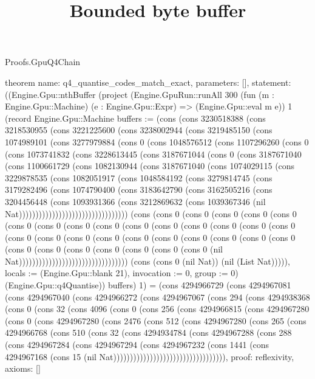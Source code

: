 \begin{lexlean}{Proofs.GpuQ4Chain}
\title{Bounded byte buffer}
\begin{semanticmodule}
theorem{
  name: q4_quantise_codes_match_exact,
  parameters: [],
  statement: ((Engine.Gpu::nthBuffer (project (Engine.GpuRun::runAll 300 (fun (m : Engine.Gpu::Machine) (e : Engine.Gpu::Expr) => (Engine.Gpu::eval m e)) 1 (record Engine.Gpu::Machine {buffers := (cons (cons 3230518388 (cons 3218530955 (cons 3221225600 (cons 3238002944 (cons 3219485150 (cons 1074989101 (cons 3277979884 (cons 0 (cons 1048576512 (cons 1107296260 (cons 0 (cons 1073741832 (cons 3228613445 (cons 3187671044 (cons 0 (cons 3187671040 (cons 1100661729 (cons 1082130944 (cons 3187671040 (cons 1074029115 (cons 3229878535 (cons 1082051917 (cons 1048584192 (cons 3279814745 (cons 3179282496 (cons 1074790400 (cons 3183642790 (cons 3162505216 (cons 3204456448 (cons 1093931366 (cons 3212869632 (cons 1039367346 (nil Nat))))))))))))))))))))))))))))))))) (cons (cons 0 (cons 0 (cons 0 (cons 0 (cons 0 (cons 0 (cons 0 (cons 0 (cons 0 (cons 0 (cons 0 (cons 0 (cons 0 (cons 0 (cons 0 (cons 0 (cons 0 (cons 0 (cons 0 (cons 0 (cons 0 (cons 0 (cons 0 (cons 0 (cons 0 (cons 0 (cons 0 (cons 0 (cons 0 (cons 0 (cons 0 (cons 0 (nil Nat))))))))))))))))))))))))))))))))) (cons (cons 0 (nil Nat)) (nil (List Nat))))), locals := (Engine.Gpu::blank 21), invocation := 0, group := 0}) (Engine.Gpu::q4Quantise)) buffers) 1) = (cons 4294966729 (cons 4294967081 (cons 4294967040 (cons 4294966272 (cons 4294967067 (cons 294 (cons 4294938368 (cons 0 (cons 32 (cons 4096 (cons 0 (cons 256 (cons 4294966815 (cons 4294967280 (cons 0 (cons 4294967280 (cons 2476 (cons 512 (cons 4294967280 (cons 265 (cons 4294966768 (cons 510 (cons 32 (cons 4294934784 (cons 4294967288 (cons 288 (cons 4294967284 (cons 4294967294 (cons 4294967232 (cons 1441 (cons 4294967168 (cons 15 (nil Nat)))))))))))))))))))))))))))))))))),
  proof: reflexivity{},
  axioms: []
}


\end{semanticmodule}
\end{lexlean}

